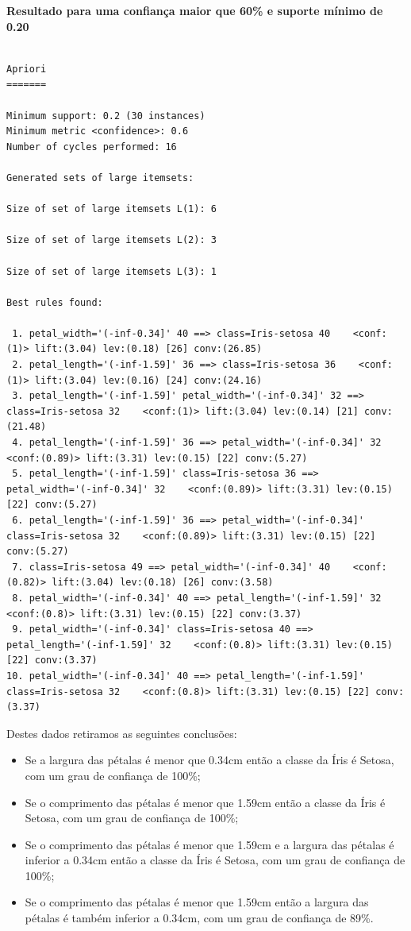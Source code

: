 \textbf{Resultado para uma confiança maior que 60\% e suporte mínimo de 0.20}

\begin{lstlisting}[breaklines,frame=single]

Apriori
=======

Minimum support: 0.2 (30 instances)
Minimum metric <confidence>: 0.6
Number of cycles performed: 16

Generated sets of large itemsets:

Size of set of large itemsets L(1): 6

Size of set of large itemsets L(2): 3

Size of set of large itemsets L(3): 1

Best rules found:

 1. petal_width='(-inf-0.34]' 40 ==> class=Iris-setosa 40    <conf:(1)> lift:(3.04) lev:(0.18) [26] conv:(26.85)
 2. petal_length='(-inf-1.59]' 36 ==> class=Iris-setosa 36    <conf:(1)> lift:(3.04) lev:(0.16) [24] conv:(24.16)
 3. petal_length='(-inf-1.59]' petal_width='(-inf-0.34]' 32 ==> class=Iris-setosa 32    <conf:(1)> lift:(3.04) lev:(0.14) [21] conv:(21.48)
 4. petal_length='(-inf-1.59]' 36 ==> petal_width='(-inf-0.34]' 32    <conf:(0.89)> lift:(3.31) lev:(0.15) [22] conv:(5.27)
 5. petal_length='(-inf-1.59]' class=Iris-setosa 36 ==> petal_width='(-inf-0.34]' 32    <conf:(0.89)> lift:(3.31) lev:(0.15) [22] conv:(5.27)
 6. petal_length='(-inf-1.59]' 36 ==> petal_width='(-inf-0.34]' class=Iris-setosa 32    <conf:(0.89)> lift:(3.31) lev:(0.15) [22] conv:(5.27)
 7. class=Iris-setosa 49 ==> petal_width='(-inf-0.34]' 40    <conf:(0.82)> lift:(3.04) lev:(0.18) [26] conv:(3.58)
 8. petal_width='(-inf-0.34]' 40 ==> petal_length='(-inf-1.59]' 32    <conf:(0.8)> lift:(3.31) lev:(0.15) [22] conv:(3.37)
 9. petal_width='(-inf-0.34]' class=Iris-setosa 40 ==> petal_length='(-inf-1.59]' 32    <conf:(0.8)> lift:(3.31) lev:(0.15) [22] conv:(3.37)
10. petal_width='(-inf-0.34]' 40 ==> petal_length='(-inf-1.59]' class=Iris-setosa 32    <conf:(0.8)> lift:(3.31) lev:(0.15) [22] conv:(3.37)

\end{lstlisting}

Destes dados retiramos as seguintes conclusões:

\begin{itemize}
  \item Se a largura das pétalas é menor que 0.34cm então a classe da Íris é Setosa, com um grau de confiança de 100\%;
  \item Se o comprimento das pétalas é menor que 1.59cm então a classe da Íris é Setosa, com um grau de confiança de 100\%;
  \item Se o comprimento das pétalas é menor que 1.59cm e a largura das pétalas é inferior a 0.34cm então a classe da Íris é Setosa, com um grau de confiança de 100\%;
  \item Se o comprimento das pétalas é menor que 1.59cm então a largura das pétalas é também inferior a 0.34cm, com um grau de confiança de 89\%.
\end{itemize}

